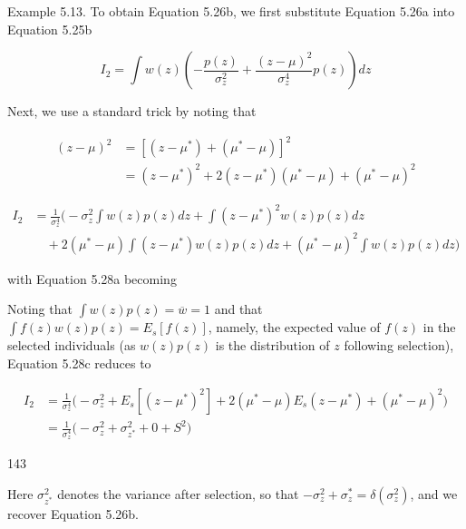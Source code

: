 \documentclass{article}
\begin{document}
Example 5.13. To obtain Equation 5.26b, we first substitute Equation 5.26a into Equation 5.25b

\begin{equation}
I_{2}=\int w(z)\left(-\frac{p(z)}{\sigma_{z}^{2}}+\frac{(z-\mu)^{2}}{\sigma_{z}^{4}}p(z)\right)d z
\tag{5.28a}
\label{eq:5_28a}
\end{equation}

Next, we use a standard trick by noting that

\begin{equation}
\begin{aligned}(z-\mu)^{2}&=[(z-\mu^{*})+(\mu^{*}-\mu)]^{2}\\&=(z-\mu^{*})^{2}+2(z-\mu^{*})(\mu^{*}-\mu)+(\mu^{*}-\mu)^{2}\end{aligned}
\tag{5.28b}
\label{eq:5_28b}
\end{equation}

\begin{equation}
\begin{align*}I_{2}&=\frac{1}{\sigma_{z}^{4}}\bigg(-\sigma_{z}^{2}\int w(z)p(z)dz+\int(z-\mu^{*})^{2}w(z)p(z)dz\\&\quad+2(\mu^{*}-\mu)\int(z-\mu^{*})w(z)p(z)dz+(\mu^{*}-\mu)^{2}\int w(z)p(z)dz\bigg)\end{align*}
\tag{5.28c}
\label{eq:5_28c}
\end{equation}

with Equation 5.28a becoming

Noting that $\int w(z)p(z) = \overline{w} = 1$ and that $\int f(z)w(z)p(z) = E_s[f(z)]$, namely, the expected value of $f(z)$ in the selected individuals (as $w(z)p(z)$ is the distribution of $z$ following selection), Equation 5.28c reduces to

\begin{equation}
\begin{aligned}I_{2}&=\frac{1}{\sigma_{z}^{4}}\Biggl(-\sigma_{z}^{2}+E_{s}[(z-\mu^{*})^{2}]+2(\mu^{*}-\mu)E_{s}(z-\mu^{*})+(\mu^{*}-\mu)^{2}\Biggr)\\&=\frac{1}{\sigma_{z}^{4}}\Biggl(-\sigma_{z}^{2}+\sigma_{z^{*}}^{2}+0+S^{2}\Biggr)\end{aligned}
\end{equation}

143

Here  $ \sigma_{z^*}^2 $ denotes the variance after selection, so that  $ -\sigma_z^2 + \sigma_z^* = \delta(\sigma_z^2) $, and we recover Equation 5.26b.
\end{document}
